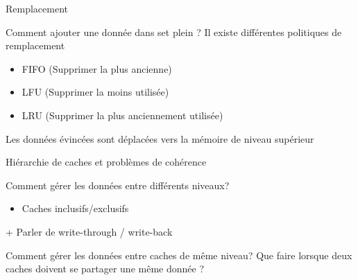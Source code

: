 \begin{frame}{Remplacement}
	\begin{block}{Comment ajouter une donnée dans set plein ?}
		Il existe différentes politiques de remplacement
		\begin{itemize}
			\item{FIFO (Supprimer la plus ancienne)}
			\item{LFU (Supprimer la moins utilisée)}
			\item{LRU (Supprimer la plus anciennement utilisée)}
		\end{itemize}
		Les données évincées sont déplacées vers la mémoire de niveau supérieur
	\end{block}
\end{frame}

\begin{frame}{Hiérarchie de caches et problèmes de cohérence}
\begin{block}{Comment gérer les données entre différents niveaux?}
		\begin{itemize}
			\item{Caches inclusifs/exclusifs}
		\end{itemize}
	\end{block}
	+ Parler de write-through / write-back
	\begin{block}{Comment gérer les données entre caches de même niveau?}
		Que faire lorsque deux caches doivent se partager une même donnée ?
	\end{block}
\end{frame}
